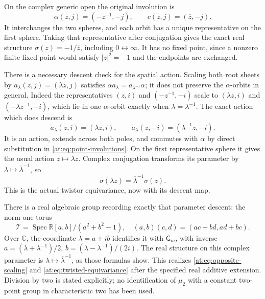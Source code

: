 \documentclass[11pt,a4paper]{article}
\theoremstyle{definition}\newtheorem{definition}[theorem]{Definition}
\newcommand{\C}{\mathbb C}\newcommand{\R}{\mathbb R}
\newcommand{\Spec}{\operatorname{Spec}}\newcommand{\SpecMon}{\operatorname{Spec}_{\mathrm{mon}}}
\newcommand{\G}{\mathsf G}\newcommand{\Tor}{\operatorname{Tor}}\newcommand{\Frac}{\operatorname{Frac}}
\begin{document}
On the complex generic open the original involution is
\[
 \alpha(z,j)=(-z^{-1},-j),\qquad
 c(z,j)=(\overline z,-j).
 \tag{AT22}\label{at:eq:point-involutions}
\]
It interchanges the two spheres, and each orbit has a unique
representative on the first sphere. Taking that representative
after conjugation gives the exact real structure
$\sigma(z)=-1/\overline z$, including $0\leftrightarrow\infty$.
It has no fixed point, since a nonzero finite fixed point would
satisfy $|z|^2=-1$ and the endpoints are exchanged.

There is a necessary descent check for the spatial action. Scaling
both root sheets by $a_\lambda(z,j)=(\lambda z,j)$ satisfies
$\alpha a_\lambda=a_{\lambda^{-1}}\alpha$; it does not
preserve the $\alpha$-orbits in general. Indeed the representatives
$(z,i)$ and $(-z^{-1},-i)$ scale to
$(\lambda z,i)$ and $(-\lambda z^{-1},-i)$, which lie in one
$\alpha$-orbit exactly when $\lambda=\lambda^{-1}$.
The exact action which does descend is
\[
 \widetilde a_\lambda(z,i)=(\lambda z,i),\qquad
 \widetilde a_\lambda(z,-i)=(\lambda^{-1}z,-i).
 \tag{AT23}\label{at:eq:opposite-scaling}
\]
It is an action, extends across both poles, and commutes with
$\alpha$ by direct substitution in \eqref{at:eq:point-involutions}.
On the first representative sphere it gives the usual action
$z\mapsto\lambda z$. Complex conjugation transforms its parameter
by $\lambda\mapsto\overline\lambda^{-1}$, so
\[
 \sigma(\lambda z)=\overline\lambda^{-1}\sigma(z).
 \tag{AT24}\label{at:eq:twisted-equivariance}
\]
This is the actual twistor equivariance, now with its descent map.

There is a real algebraic group recording exactly that parameter
descent: the norm-one torus
\[
 \mathcal T=\Spec\R[a,b]/(a^2+b^2-1),
 \quad(a,b)(c,d)=(ac-bd,ad+bc).
 \tag{AT25}\label{at:eq:real-torus}
\]
Over $\C$, the coordinate $\lambda=a+ib$ identifies it with
$\G_m$, with inverse $a=(\lambda+\lambda^{-1})/2$,
$b=(\lambda-\lambda^{-1})/(2i)$. The real structure on this
complex parameter is $\lambda\mapsto\overline\lambda^{-1}$,
as those formulas show. This realizes \eqref{at:eq:opposite-scaling}
and \eqref{at:eq:twisted-equivariance} after the specified real
additive extension. Division by two is stated explicitly; no
identification of $\mu_2$ with a constant two-point group in
characteristic two has been used.
\end{document}
